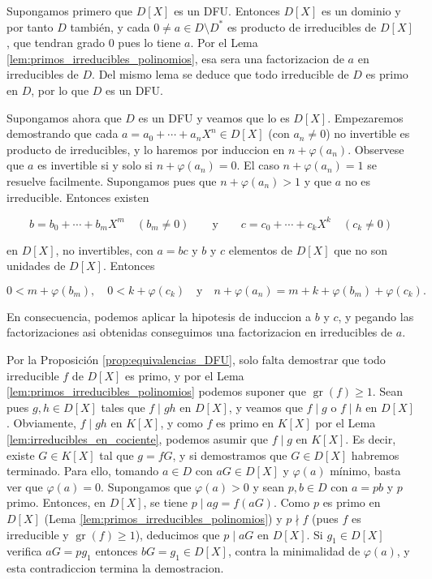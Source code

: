 \begin{proofbox}
Supongamos primero que $D[X]$ es un DFU. Entonces $D[X]$ es un dominio y por tanto $D$ también, y cada $0\neq a\in D\setminus D^{*}$ es producto de irreducibles de $D[X]$, que tendran grado 0 pues lo tiene $a$. Por el Lema \ref{lem:primos_irreducibles_polinomios}, esa sera una factorizacion de $a$ en irreducibles de $D$. Del mismo lema se deduce que todo irreducible de $D$ es primo en $D$, por lo que $D$ es un DFU.

Supongamos ahora que $D$ es un DFU y veamos que lo es $D[X]$. Empezaremos demostrando que cada $a=a_{0}+\cdots+a_{n}X^{n}\in D[X]$ (con $a_{n}\neq 0$) no invertible es producto de irreducibles, y lo haremos por induccion en $n+\varphi(a_{n})$. Observese que $a$ es invertible si y solo si $n+\varphi(a_{n})=0$. El caso $n+\varphi(a_{n})=1$ se resuelve facilmente. Supongamos pues que $n+\varphi(a_{n})>1$ y que $a$ no es irreducible. Entonces existen

\[b=b_{0}+\cdots+b_{m}X^{m}\quad(b_{m}\neq 0)\qquad\text{y}\qquad c=c_{0}+\cdots +c_{k}X^{k}\quad(c_{k}\neq 0)\]

en $D[X]$, no invertibles, con $a=bc$ y $b$ y $c$ elementos de $D[X]$ que no son unidades de $D[X]$. Entonces

\[0<m+\varphi(b_{m}),\quad 0<k+\varphi(c_{k})\quad\text{y}\quad n+\varphi(a_{n})= m+k+\varphi(b_{m})+\varphi(c_{k}).\]

En consecuencia, podemos aplicar la hipotesis de induccion a $b$ y $c$, y pegando las factorizaciones asi obtenidas conseguimos una factorizacion en irreducibles de $a$.

Por la Proposición \ref{prop:equivalencias_DFU}, solo falta demostrar que todo irreducible $f$ de $D[X]$ es primo, y por el Lema \ref{lem:primos_irreducibles_polinomios} podemos suponer que $\operatorname{gr}(f)\geq 1$. Sean pues $g,h\in D[X]$ tales que $f\mid gh$ en $D[X]$, y veamos que $f\mid g$ o $f\mid h$ en $D[X]$. Obviamente, $f\mid gh$ en $K[X]$, y como $f$ es primo en $K[X]$ por el Lema \ref{lem:irreducibles_en_cociente}, podemos asumir que $f\mid g$ en $K[X]$. Es decir, existe $G\in K[X]$ tal que $g=fG$, y si demostramos que $G\in D[X]$ habremos terminado. Para ello, tomando $a\in D$ con $aG\in D[X]$ y $\varphi(a)$ mínimo, basta ver que $\varphi(a)=0$. Supongamos que $\varphi(a)>0$ y sean $p,b\in D$ con $a=pb$ y $p$ primo. Entonces, en $D[X]$, se tiene $p\mid ag=f(aG)$. Como $p$ es primo en $D[X]$ (Lema \ref{lem:primos_irreducibles_polinomios}) y $p\nmid f$ (pues $f$ es irreducible y $\operatorname{gr}(f)\geq 1$), deducimos que $p\mid aG$ en $D[X]$. Si $g_{1}\in D[X]$ verifica $aG=pg_{1}$ entonces $bG=g_{1}\in D[X]$, contra la minimalidad de $\varphi(a)$, y esta contradiccion termina la demostracion.
\end{proofbox}

